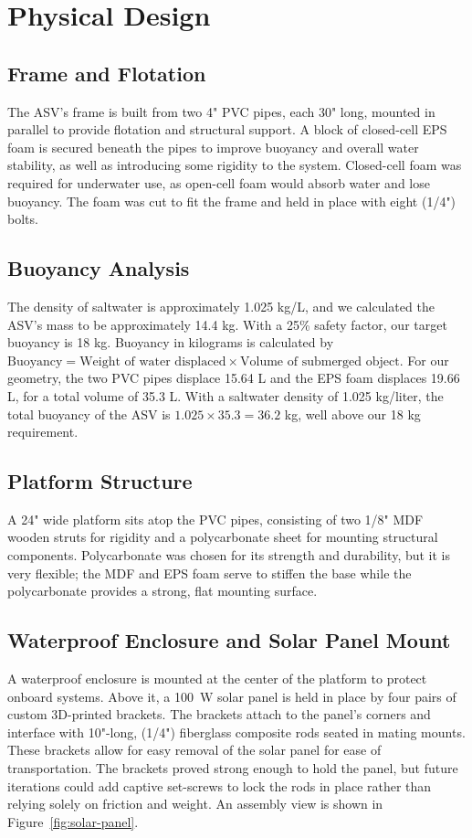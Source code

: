 \section{Physical Design}
\subsection{Frame and Flotation}
The ASV's frame is built from two 4" PVC pipes, each 30" long, mounted in parallel to provide flotation and structural support. A block of closed-cell EPS foam is secured beneath the pipes to improve buoyancy and overall water stability, as well as introducing some rigidity to the system. Closed-cell foam was required for underwater use, as open-cell foam would absorb water and lose buoyancy. The foam was cut to fit the frame and held in place with eight (1/4") bolts.

\subsection{Buoyancy Analysis}
The density of saltwater is approximately 1.025 kg/L, and we calculated the ASV's mass to be approximately 14.4 kg. With a 25\% safety factor, our target buoyancy is 18 kg. Buoyancy in kilograms is calculated by \(\text{Buoyancy} = \text{Weight of water displaced} \times \text{Volume of submerged object}\). For our geometry, the two PVC pipes displace 15.64 L and the EPS foam displaces 19.66 L, for a total volume of 35.3 L. With a saltwater density of 1.025 kg/liter, the total buoyancy of the ASV is \(1.025 \times 35.3 = 36.2 \) kg, well above our 18 kg requirement.

\subsection{Platform Structure}
A 24" wide platform sits atop the PVC pipes, consisting of two 1/8" MDF wooden struts for rigidity and a polycarbonate sheet for mounting structural components. Polycarbonate was chosen for its strength and durability, but it is very flexible; the MDF and EPS foam serve to stiffen the base while the polycarbonate provides a strong, flat mounting surface.

\subsection{Waterproof Enclosure and Solar Panel Mount}
A waterproof enclosure is mounted at the center of the platform to protect onboard systems. Above it, a \SI{100}{\watt} solar panel is held in place by four pairs of custom 3D-printed brackets. The brackets attach to the panel's corners and interface with 10"-long, (1/4") fiberglass composite rods seated in mating mounts. These brackets allow for easy removal of the solar panel for ease of transportation. The brackets proved strong enough to hold the panel, but future iterations could add captive set-screws to lock the rods in place rather than relying solely on friction and weight. An assembly view is shown in Figure~\ref{fig:solar-panel}.

